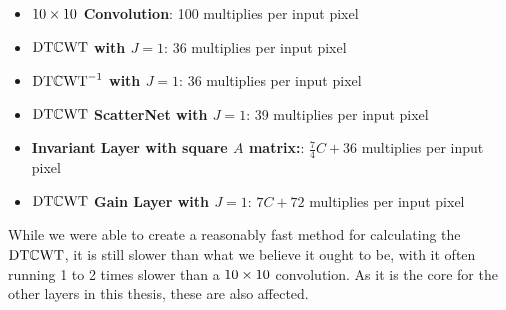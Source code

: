 \pagebreak
\begin{itemize}
  \item \textbf{$10\times10$ Convolution}: 100 multiplies per input pixel
  \item \textbf{$\mathrm{DT}\mathbb{C}\mathrm{WT}$ with $J=1$}: 36 multiplies per input pixel
  \item \textbf{$\mathrm{DT}\mathbb{C}\mathrm{WT}^{-1}$ with $J=1$}: 36 multiplies per input pixel
  \item \textbf{$\mathrm{DT}\mathbb{C}\mathrm{WT}$ ScatterNet with $J=1$}: 39 multiplies per input pixel
  \item \textbf{Invariant Layer with square $A$ matrix:}: $\frac{7}{4}C + 36$ multiplies per input pixel
  \item \textbf{$\mathrm{DT}\mathbb{C}\mathrm{WT}$ Gain Layer with $J=1$}: $7C + 72$ multiplies per input pixel
\end{itemize}

While we were able to create a reasonably fast method for calculating the $\mathrm{DT}\mathbb{C}\mathrm{WT}$, it is
still slower than what we believe it ought to be, with it often running 1 to 2 times
slower than a $10\times 10$ convolution. As it is the core for the other layers in
this thesis, these are also affected.

